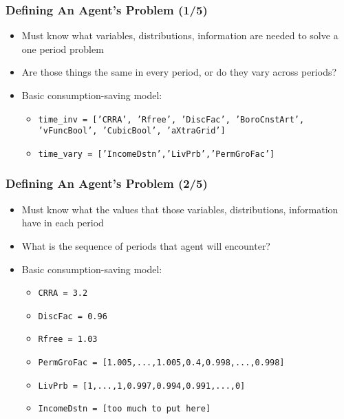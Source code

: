 \documentclass[11ptt]{beamer}
\newcommand{\bi}{\begin{itemize}}
\newcommand{\ei}{\end{itemize}}
\begin{document}
\begin{frame}
\frametitle{Defining An Agent's Problem (1/5)}
\bi
\item <1->Must know what variables, distributions, information are needed to solve a one period problem

\item <1->Are those things the same in every period, or do they vary across periods?

\item <2->Basic consumption-saving model:
\bi
\item \texttt{time\_inv = ['CRRA', 'Rfree', 'DiscFac', 'BoroCnstArt', 'vFuncBool', 'CubicBool', 'aXtraGrid']}

\item \texttt{time\_vary = ['IncomeDstn','LivPrb','PermGroFac']}
\ei
\ei
\end{frame}




\begin{frame}
\frametitle{Defining An Agent's Problem (2/5)}
\bi
\item <1->Must know what the values that those variables, distributions, information have in each period

\item <1->What is the sequence of periods that agent will encounter?

\item <2->Basic consumption-saving model:
\bi
\item \texttt{CRRA = 3.2}

\item \texttt{DiscFac = 0.96}

\item \texttt{Rfree = 1.03}

\item \texttt{PermGroFac = [1.005,...,1.005,0.4,0.998,...,0.998]}

\item \texttt{LivPrb = [1,...,1,0.997,0.994,0.991,...,0]}

\item \texttt{IncomeDstn = [too much to put here]}
\ei
\ei
\end{frame}
\end{document}
